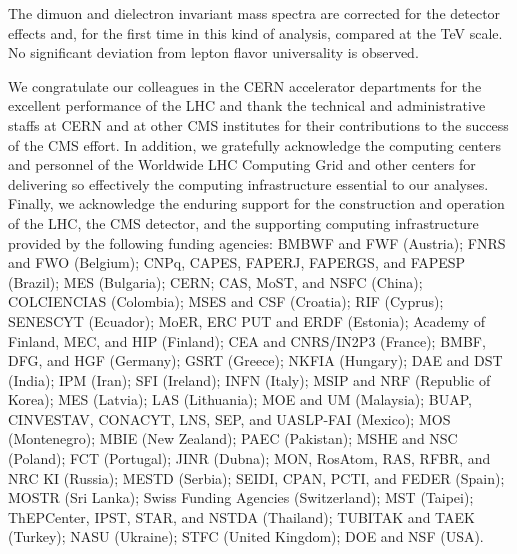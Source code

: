\documentclass[11pt,twoside,a4paper,cmspaper,final,collab]{cms-tdr}
\begin{document}
The dimuon and dielectron invariant mass spectra are corrected for the detector effects and, for the first time in this kind of analysis, compared at the TeV scale. No significant deviation from lepton flavor universality is observed. 
\label{sec:summary}


\begin{acknowledgments}
  We congratulate our colleagues in the CERN accelerator departments for the excellent performance of the LHC and thank the technical and administrative staffs at CERN and at other CMS institutes for their contributions to the success of the CMS effort. In addition, we gratefully acknowledge the computing centers and personnel of the Worldwide LHC Computing Grid and other centers for delivering so effectively the computing infrastructure essential to our analyses. Finally, we acknowledge the enduring support for the construction and operation of the LHC, the CMS detector, and the supporting computing infrastructure provided by the following funding agencies: BMBWF and FWF (Austria); FNRS and FWO (Belgium); CNPq, CAPES, FAPERJ, FAPERGS, and FAPESP (Brazil); MES (Bulgaria); CERN; CAS, MoST, and NSFC (China); COLCIENCIAS (Colombia); MSES and CSF (Croatia); RIF (Cyprus); SENESCYT (Ecuador); MoER, ERC PUT and ERDF (Estonia); Academy of Finland, MEC, and HIP (Finland); CEA and CNRS/IN2P3 (France); BMBF, DFG, and HGF (Germany); GSRT (Greece); NKFIA (Hungary); DAE and DST (India); IPM (Iran); SFI (Ireland); INFN (Italy); MSIP and NRF (Republic of Korea); MES (Latvia); LAS (Lithuania); MOE and UM (Malaysia); BUAP, CINVESTAV, CONACYT, LNS, SEP, and UASLP-FAI (Mexico); MOS (Montenegro); MBIE (New Zealand); PAEC (Pakistan); MSHE and NSC (Poland); FCT (Portugal); JINR (Dubna); MON, RosAtom, RAS, RFBR, and NRC KI (Russia); MESTD (Serbia); SEIDI, CPAN, PCTI, and FEDER (Spain); MOSTR (Sri Lanka); Swiss Funding Agencies (Switzerland); MST (Taipei); ThEPCenter, IPST, STAR, and NSTDA (Thailand); TUBITAK and TAEK (Turkey); NASU (Ukraine); STFC (United Kingdom); DOE and NSF (USA).
  

\end{acknowledgments}
\end{document}
